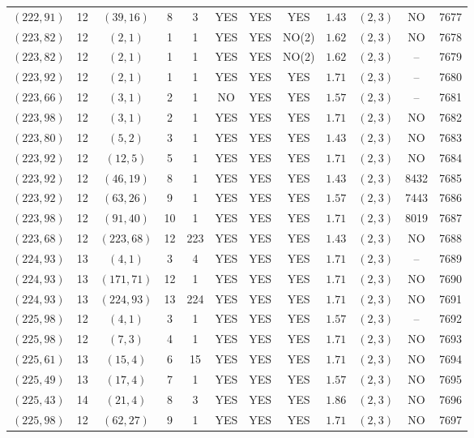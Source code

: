 \begin{longtable}{|c|c|c|c|c|c|c|c|c|c|c|c|}
$(222,91)$ & 12 & $(39,16)$ & 8 & 3 & YES & YES & YES & $1.43$ & $(2,3)$ & NO & 7677\\
$(223,82)$ & 12 & $(2,1)$ & 1 & 1 & YES & YES & NO(2) & $1.62$ & $(2,3)$ & NO & 7678\\
$(223,82)$ & 12 & $(2,1)$ & 1 & 1 & YES & YES & NO(2) & $1.62$ & $(2,3)$ & -- & 7679\\
$(223,92)$ & 12 & $(2,1)$ & 1 & 1 & YES & YES & YES & $1.71$ & $(2,3)$ & -- & 7680\\
$(223,66)$ & 12 & $(3,1)$ & 2 & 1 & NO & YES & YES & $1.57$ & $(2,3)$ & -- & 7681\\
$(223,98)$ & 12 & $(3,1)$ & 2 & 1 & YES & YES & YES & $1.71$ & $(2,3)$ & NO & 7682\\
$(223,80)$ & 12 & $(5,2)$ & 3 & 1 & YES & YES & YES & $1.43$ & $(2,3)$ & NO & 7683\\
$(223,92)$ & 12 & $(12,5)$ & 5 & 1 & YES & YES & YES & $1.71$ & $(2,3)$ & NO & 7684\\
$(223,92)$ & 12 & $(46,19)$ & 8 & 1 & YES & YES & YES & $1.43$ & $(2,3)$ & 8432 & 7685\\
$(223,92)$ & 12 & $(63,26)$ & 9 & 1 & YES & YES & YES & $1.57$ & $(2,3)$ & 7443 & 7686\\
$(223,98)$ & 12 & $(91,40)$ & 10 & 1 & YES & YES & YES & $1.71$ & $(2,3)$ & 8019 & 7687\\
$(223,68)$ & 12 & $(223,68)$ & 12 & 223 & YES & YES & YES & $1.43$ & $(2,3)$ & NO & 7688\\
$(224,93)$ & 13 & $(4,1)$ & 3 & 4 & YES & YES & YES & $1.71$ & $(2,3)$ & -- & 7689\\
$(224,93)$ & 13 & $(171,71)$ & 12 & 1 & YES & YES & YES & $1.71$ & $(2,3)$ & NO & 7690\\
$(224,93)$ & 13 & $(224,93)$ & 13 & 224 & YES & YES & YES & $1.71$ & $(2,3)$ & NO & 7691\\
$(225,98)$ & 12 & $(4,1)$ & 3 & 1 & YES & YES & YES & $1.57$ & $(2,3)$ & -- & 7692\\
$(225,98)$ & 12 & $(7,3)$ & 4 & 1 & YES & YES & YES & $1.71$ & $(2,3)$ & NO & 7693\\
$(225,61)$ & 13 & $(15,4)$ & 6 & 15 & YES & YES & YES & $1.71$ & $(2,3)$ & NO & 7694\\
$(225,49)$ & 13 & $(17,4)$ & 7 & 1 & YES & YES & YES & $1.57$ & $(2,3)$ & NO & 7695\\
$(225,43)$ & 14 & $(21,4)$ & 8 & 3 & YES & YES & YES & $1.86$ & $(2,3)$ & NO & 7696\\
$(225,98)$ & 12 & $(62,27)$ & 9 & 1 & YES & YES & YES & $1.71$ & $(2,3)$ & NO & 7697\\

\end{longtable}

